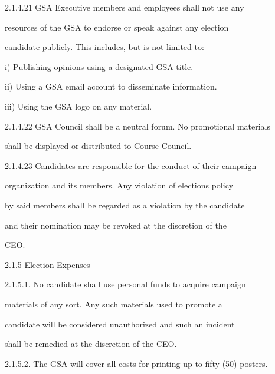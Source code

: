   

2.1.4.21       GSA   Executive   members   and   employees   shall   not   use   any  

               resources  of  the  GSA  to  endorse  or  speak  against  any  election  

               candidate publicly. This includes, but is not limited to:   

  

                  i)        Publishing opinions using a designated GSA title.   

  

                  ii)      Using a GSA email account to disseminate information.   

  

                  iii)     Using the GSA logo on any material.  

  

  

2.1.4.22       GSA Council shall be a neutral forum. No promotional materials  

               shall be displayed or distributed to Course Council.   

  

2.1.4.23       Candidates  are  responsible  for  the  conduct  of  their  campaign  

               organization  and  its  members.  Any  violation  of  elections  policy  

               by said members shall be regarded as a violation by the candidate  

               and  their  nomination  may  be  revoked  at  the  discretion  of  the  

               CEO.   

  

2.1.5  Election Expenses  

2.1.5.1.      No   candidate   shall   use   personal   funds   to   acquire   campaign  

              materials  of  any  sort.  Any  such  materials  used  to  promote  a  

              candidate  will  be  considered  unauthorized  and  such  an  incident  

              shall be remedied at the discretion of the CEO.   

2.1.5.2.      The GSA will cover all costs for printing up to fifty (50) posters.  

  


